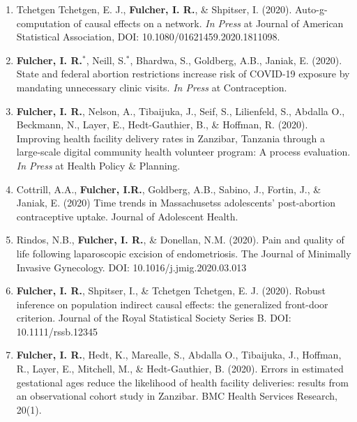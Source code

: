 \documentclass[12pt]{article}
\begin{document}
\begin{enumerate}

\setcounter{enumi}{0}

	\item Tchetgen Tchetgen, E. J., \textbf{Fulcher, I. R.}, \& Shpitser, I. (2020). Auto-g-computation of causal effects on a network. \textit{In Press} at Journal of American Statistical Association, DOI: 10.1080/01621459.2020.1811098.
	
	\item \textbf{Fulcher, I. R.}$^{*}$, Neill, S.$^{*}$, Bhardwa, S., Goldberg, A.B., Janiak, E. (2020). State and federal abortion restrictions increase risk of COVID-19 exposure by mandating unnecessary clinic visits. \textit{In Press} at Contraception. 
	
	\item \textbf{Fulcher, I. R.}, Nelson, A., Tibaijuka, J., Seif, S., Lilienfeld, S., Abdalla O., Beckmann, N., Layer, E., Hedt-Gauthier, B., \& Hoffman, R. (2020). Improving health facility delivery rates in Zanzibar, Tanzania through a large-scale digital community health volunteer program: A process evaluation. \textit{In Press} at Health Policy \& Planning. 
	
	\item Cottrill, A.A., \textbf{Fulcher, I.R.}, Goldberg, A.B., Sabino, J., Fortin, J., \& Janiak, E. (2020) Time trends in Massachusetss adolescents' post-abortion contraceptive uptake. Journal of Adolescent Health. 
	
	\item Rindos, N.B., \textbf{Fulcher, I. R.}, \& Donellan, N.M. (2020). Pain and quality of life following laparoscopic excision of endometriosis. The Journal of Minimally Invasive Gynecology. DOI: 10.1016/j.jmig.2020.03.013
	
	\item \textbf{Fulcher, I. R.}, Shpitser, I., \& Tchetgen Tchetgen, E. J. (2020). Robust inference on population indirect causal effects: the generalized front-door criterion. Journal of the Royal Statistical Society Series B. DOI: 10.1111/rssb.12345
	
	\item \textbf{Fulcher, I. R.}, Hedt, K., Marealle, S., Abdalla O., Tibaijuka, J., Hoffman, R., Layer, E., Mitchell, M., \& Hedt-Gauthier, B. (2020). Errors in estimated gestational ages reduce the likelihood of health facility deliveries: results from an observational cohort study in Zanzibar. BMC Health Services Research, 20(1).
	

\end{enumerate}
\end{document}
